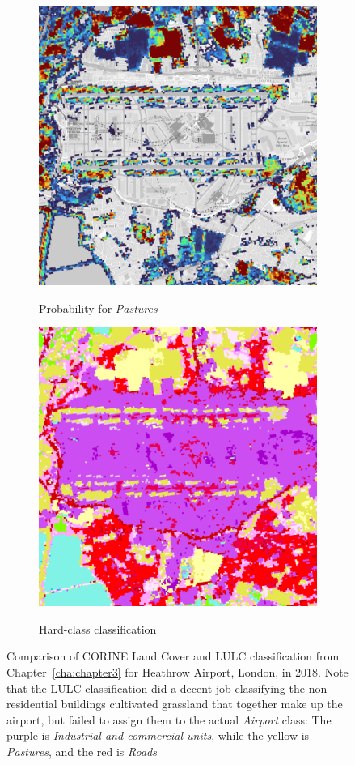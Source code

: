 \begin{figure}[H]
\begin{subfigure}[b]{0.48\textwidth}
        \end{subfigure}
        \vspace{0.5em}
        \begin{subfigure}[b]{0.48\textwidth}
        \centering
        \caption{Probability for \textit{Pastures}}
        \includegraphics[width=\textwidth,height=0.7\textwidth]{figs_06/heathrow_p_pastures.png}
        \label{fig:heathrow_pastures}
        \end{subfigure}
        \hfill
        \begin{subfigure}[b]{0.48\textwidth}
        \centering
        \caption{Hard-class classification}
        \includegraphics[width=\textwidth,height=0.7\textwidth]{figs_06/heathrow_lulc.png}
        \label{fig:heathrow_industrial-commercial}
        \end{subfigure}
        \label{fig:heathrow}
        \caption{Comparison of CORINE Land Cover and LULC classification from Chapter\@~\ref{cha:chapter3} for Heathrow Airport, London, in 2018. Note that the LULC classification did a decent job classifying the non-residential buildings cultivated grassland that together make up the airport, but failed to assign them to the actual \textit{Airport} class: The purple is \textit{Industrial and commercial units}, while the yellow is \textit{Pastures}, and the red is \textit{Roads}}
        \end{figure}

